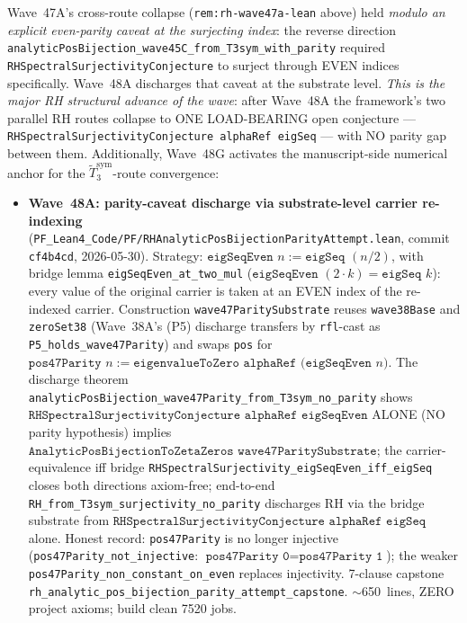 \begin{remark}\label{rem:rh-wave48a-lean}
Wave~47A's cross-route collapse (\texttt{rem:rh-wave47a-lean} above) held \emph{modulo an explicit even-parity caveat at the surjecting index}: the reverse direction \texttt{analyticPosBijection\_wave45C\_from\_T3sym\_with\_parity} required \texttt{RHSpectralSurjectivityConjecture} to surject through EVEN indices specifically. Wave~48A discharges that caveat at the substrate level. \emph{This is the major RH structural advance of the wave}: after Wave~48A the framework's two parallel RH routes collapse to ONE LOAD-BEARING open conjecture --- \texttt{RHSpectralSurjectivityConjecture alphaRef eigSeq} --- with NO parity gap between them. Additionally, Wave~48G activates the manuscript-side numerical anchor for the $\widetilde{T}_3^{\mathrm{sym}}$-route convergence:
\begin{itemize}
  \item \textbf{Wave~48A: parity-caveat discharge via substrate-level carrier re-indexing} (\texttt{PF\_Lean4\_Code/PF/RHAnalyticPosBijectionParityAttempt.lean}, commit \texttt{cf4b4cd}, 2026-05-30). Strategy: $\texttt{eigSeqEven } n := \texttt{eigSeq } (n / 2)$, with bridge lemma \texttt{eigSeqEven\_at\_two\_mul} ($\texttt{eigSeqEven } (2\cdot k) = \texttt{eigSeq } k$): every value of the original carrier is taken at an EVEN index of the re-indexed carrier. Construction \texttt{wave47ParitySubstrate} reuses \texttt{wave38Base} and \texttt{zeroSet38} (Wave~38A's (P5) discharge transfers by \texttt{rfl}-cast as \texttt{P5\_holds\_wave47Parity}) and swaps \texttt{pos} for $\texttt{pos47Parity } n := \texttt{eigenvalueToZero alphaRef (eigSeqEven } n\texttt{)}$. The discharge theorem \texttt{analyticPosBijection\_wave47Parity\_from\_T3sym\_no\_parity} shows $\texttt{RHSpectralSurjectivityConjecture alphaRef eigSeqEven}$ ALONE (NO parity hypothesis) implies $\texttt{AnalyticPosBijectionToZetaZeros wave47ParitySubstrate}$; the carrier-equivalence iff bridge \texttt{RHSpectralSurjectivity\_eigSeqEven\_iff\_eigSeq} closes both directions axiom-free; end-to-end \texttt{RH\_from\_T3sym\_surjectivity\_no\_parity} discharges RH via the bridge substrate from $\texttt{RHSpectralSurjectivityConjecture alphaRef eigSeq}$ alone. Honest record: \texttt{pos47Parity} is no longer injective (\texttt{pos47Parity\_not\_injective}: $\texttt{pos47Parity 0} = \texttt{pos47Parity 1}$); the weaker \texttt{pos47Parity\_non\_constant\_on\_even} replaces injectivity. 7-clause capstone \texttt{rh\_analytic\_pos\_bijection\_parity\_attempt\_capstone}. $\sim$650~lines, ZERO project axioms; build clean 7520 jobs.

\end{itemize}
\end{remark}
